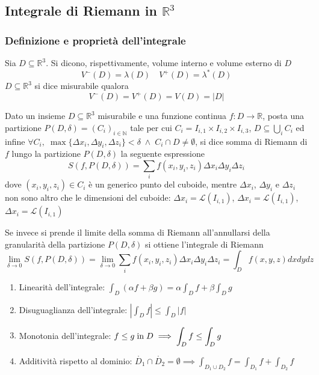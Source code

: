     \subsection{Integrale di Riemann in \texorpdfstring{$\mathbb{R}^{3}$}{R3}}
        \subsubsection{Definizione e proprietà dell'integrale}
        Sia $D \subseteq \mathbb{R}^{3}$. Si dicono, rispettivamente, volume interno e volume esterno di $D$
        \[
            V^{-}(D) = \lambda(D) \quad V^{+}(D) = \lambda^{*}(D)
        \]
        $D \subseteq \mathbb{R}^{3}$ si dice misurabile qualora
        \[
            V^{-}(D) = V^{+}(D) = V(D) = |D|
        \]

        Dato un insieme $D \subseteq \mathbb{R}^{3}$ misurabile e una funzione continua $f: D \rightarrow \mathbb{R}$, posta una partizione $P(D, \delta) = (C_{i})_{i \in \mathbb{N}}$ tale per cui $C_{i} = I_{i, 1} \times I_{i, 2} \times I_{i, 3}$, $D \subseteq \displaystyle \bigcup_{i} C_{i}$ ed infine $\forall C_{i}, \; \max\{\Delta x_{i}, \Delta y_{i}, \Delta z_{i}\} < \delta \; \land \; C_{i} \cap D \neq \emptyset$,
        si dice somma di Riemann di $f$ lungo la partizione $P(D, \delta)$ la seguente espressione
        \[
            S(f, P(D, \delta)) = \sum_{i} f(x_i, y_i, z_i) \Delta x_i \Delta y_i \Delta z_i
        \]
        dove $(x_i, y_i, z_i) \in C_{i}$ è un generico punto del cuboide, mentre $\Delta x_i$, $\Delta y_i$ e $\Delta z_i$ non sono altro che le dimensioni del cuboide: $\Delta x_i = \mathcal{L}(I_{i, 1})$, $\Delta x_i = \mathcal{L}(I_{i, 1})$, $\Delta x_i = \mathcal{L}(I_{i, 1})$

        Se invece si prende il limite della somma di Riemann all'annullarsi della granularità della partizione $P(D, \delta)$ si ottiene l'integrale di Riemann
        \[
            \lim_{\delta \rightarrow 0} S(f, P(D, \delta)) = \lim_{\delta \rightarrow 0} \sum_{i}f(x_i, y_i, z_i) \Delta x_i \Delta y_i \Delta z_i = \int_{D} f(x, y, z) dx dy dz
        \]

        \begin{enumerate}[label=(\arabic*)]
            \item Linearità dell'integrale: $\displaystyle \int_{D} (\alpha f + \beta g) = \alpha \int_{D} f + \beta \int_{D} g$
            \item Disuguaglianza dell'integrale: $\displaystyle \left| \int_{D} f \right| \leq \int_{D} |f| $
            \item Monotonia dell'integrale: $\displaystyle f \leq g \; \textnormal{in} \; D \implies \int_{D} f \leq \int_{D} g$
            \item Additività rispetto al dominio: $\displaystyle \mathring{D_1} \cap \mathring{D_2} = \emptyset \implies \int_{D_1 \cup D_2} f = \int_{D_1} f + \int_{D_2} f$
        \end{enumerate}


